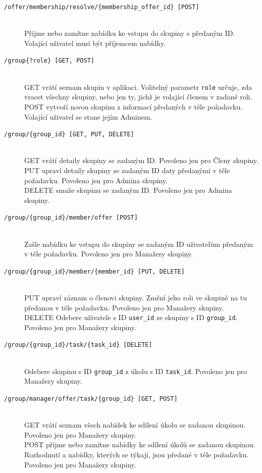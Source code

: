 \documentclass[thesis=B,czech]{FITthesis}[2012/06/26]
\newcommand{\foradmin}{Povoleno jen pro Admina skupiny.}
\newcommand{\formanagers}{Povoleno jen pro Manažery skupiny.}
\newcommand{\formembers}{Povoleno jen pro Členy skupiny.}
\begin{document}
\begin{description}
			\item[\texttt{/offer/membership/resolve/\{membership\_offer\_id\} [POST]}] \hfill \\
				Přijme nebo zamítne nabídku ke vstupu do skupiny s předaným ID.  Volající uživatel musí být příjemcem nabídky.
			
			\item[\texttt{/group\{?role\} [GET, POST]}] \hfill \\
				GET vrátí seznam skupin v aplikaci. Volitelný parametr \texttt{role} určuje, zda vracet všechny skupiny, nebo jen ty, jichž je volající členem v zadané roli. \\
				POST vytvoří novou skupinu z informací předaných v těle požadavku. Volající uživatel se stane jejím Adminem.
			
			\item[\texttt{/group/\{group\_id\} [GET, PUT, DELETE]}] \hfill \\
				GET vrátí detaily skupiny se zadaným ID. \formembers \\
				PUT upraví detaily skupiny se zadaným ID daty předanými v těle požadavku. \foradmin \\
				DELETE smaže skupinu se zadaným ID. \foradmin 

			\item[\texttt{/group/\{group\_id\}/member/offer [POST]}] \hfill \\
				Zašle nabídku ke vstupu do skupiny se zadaným ID uživatelům předaným v těle požadavku. \formanagers

			\item[\texttt{/group/\{group\_id\}/member/\{member\_id\} [PUT, DELETE]}] \hfill \\
				PUT upraví záznam o členovi skupiny. Změní jeho roli ve skupině na tu předanou v těle požadavku. \formanagers \\
				DELETE Odebere uživatele s ID \texttt{user\_id} ze skupiny s ID \texttt{group\_id}. \formanagers
			
			\item[\texttt{/group/\{group\_id\}/task/\{task\_id\} [DELETE]}] \hfill \\
				Odebere skupinu s ID \texttt{group\_id} z úkolu s ID \texttt{task\_id}. \formanagers
			
			\item[\texttt{/group/manager/offer/task/\{group\_id\} [GET, POST]}] \hfill \\
				GET vrátí seznam všech nabídek ke sdílení úkolu se zadanou skupinou. \formanagers \\
				POST přijme nebo zamítne nabídky ke sdílení úkolů se zadanou skupinou. Rozhodnutí a nabídky, kterých se týkají, jsou předané v těle požadavku. \formanagers

			\end{description}
			
\end{document}
